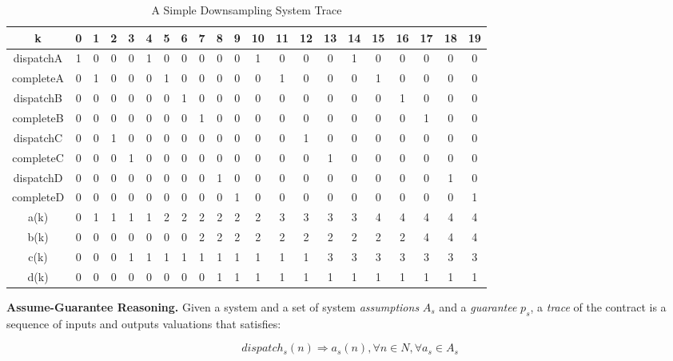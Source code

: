 \begin{table}[h!]
\begin{center}
\caption{A Simple Downsampling System Trace}
\label{tab:table1}
\begin{tabular}{ |c|c|c|c|c|c|c|c|c|c|c|c|c|c|c|c|c|c|c|c|c|} 
\hline
            k & 0 & 1 & 2 & 3 & 4 & 5 & 6 & 7 & 8 & 9 & 10  & 11 & 12 & 13 & 14 & 15 & 16 & 17 & 18 & 19 \\
\hline
dispatchA  & 1 & 0 & 0 & 0 & 1 & 0 & 0 & 0 & 0 & 0 & 1 & 0 & 0 & 0 & 1 & 0 & 0 & 0 & 0 & 0  \\ 
\hline
completeA & 0 & 1 & 0 & 0 & 0 & 1 & 0 & 0 & 0 & 0 & 0 & 1 & 0 & 0 & 0 & 1 & 0 & 0 & 0 & 0  \\ 
\hline
dispatchB & 0 & 0 & 0 & 0 & 0 & 0 & 1 & 0 & 0 & 0 & 0 & 0 & 0 & 0 & 0 & 0 & 1 & 0 & 0 & 0  \\ 
\hline
completeB & 0 & 0 & 0 &0 & 0 & 0 & 0 & 1 & 0 & 0 & 0 & 0 & 0 & 0 & 0 & 0 & 0 & 1 & 0 & 0 \\ 
\hline
dispatchC & 0 & 0 & 1 & 0 & 0 & 0 & 0 & 0 & 0 & 0 & 0 & 0 & 1 & 0 & 0 & 0 & 0 & 0 & 0 & 0  \\ 
\hline
completeC & 0 & 0 & 0 & 1  & 0 & 0 & 0 & 0 & 0 & 0 & 0 & 0 & 0 & 1 & 0 & 0 & 0 & 0 & 0 & 0 \\ 
\hline
dispatchD & 0 & 0 & 0 & 0 & 0 & 0 & 0 & 0 & 1 & 0 & 0 & 0 & 0 & 0 & 0 & 0 & 0 & 0 & 1 & 0 \\ 
\hline
completeD & 0 & 0 & 0 & 0  & 0 & 0 & 0 & 0 & 0 & 1 & 0 & 0 & 0 & 0 & 0 & 0 & 0 & 0 & 0 & 1 \\ 
\hline
a(k) & 0 & 1 & 1 & 1 & 1 & 2 & 2 & 2 & 2 & 2 & 2 & 3 & 3 & 3 & 3 & 4 & 4 & 4 & 4 & 4 \\
\hline
b(k) & 0 & 0 & 0 & 0 & 0 & 0 & 0 & 2 & 2 & 2 & 2 & 2 & 2 & 2 & 2 & 2 & 2 & 4 & 4 & 4 \\
\hline
c(k) & 0 & 0 & 0 & 1 & 1 & 1 & 1 & 1 & 1 & 1 & 1 & 1 & 1 & 3 & 3 & 3 & 3 & 3 & 3 & 3 \\
\hline
d(k) & 0 & 0 & 0 & 0 & 0 & 0 & 0 & 0 & 1 & 1 & 1 & 1 & 1 & 1 & 1 & 1 & 1 & 1 & 1 & 1 \\
\hline
\end{tabular}
\end{center}
\end{table}

{\bf Assume-Guarantee Reasoning.}
Given a system and a set of system \emph{assumptions} $A_s$ and a \emph{guarantee} $p_s$, a \emph{trace} of the contract is a sequence of inputs and outputs valuations that satisfies:

\begin{equation} 
\label{eqn:sys_assumption}
dispatch_s(n) \Rightarrow a_s(n), \forall n\in N, \forall a_s \in A_s
\end{equation}

